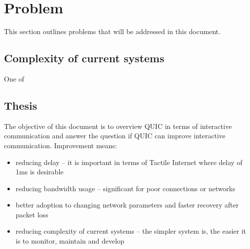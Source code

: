 \section{Problem}
\label{sec:problem}
This section outlines problems that will be addressed in this document.

\subsection{Complexity of current systems}
One of 

\subsection{Thesis}
The objective of this document is to overview QUIC in terms of interactive communication and answer the question if QUIC can improve interactive communication.
Improvement means:
\begin{itemize}
    \item reducing delay -- it is important in terms of Tactile Internet where delay of 1ms is desirable
    \item reducing bandwidth usage -- significant for poor connections or networks
    \item better adoption to changing network parameters and faster recovery after packet loss
    \item reducing complexity of current systems -- the simpler system is, the easier it is to monitor, maintain and develop
\end{itemize}
